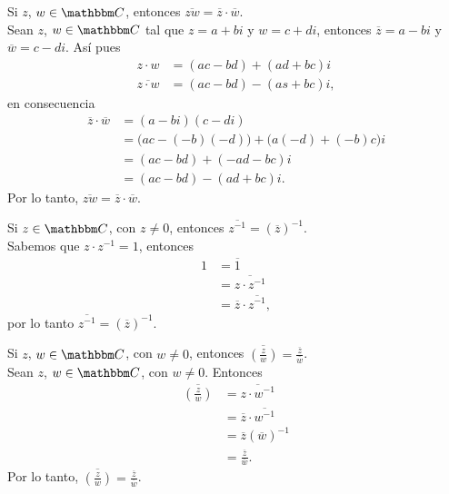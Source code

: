 \begin{proposition}
    Si $z$, $w \in \CC$, entonces $\overline{zw}=\overline{z} \cdot \overline{w}$. \\
    \demostracion Sean $z$, $w \in \CC$ tal que $z=a+bi$ y $w=c+di$, entonces $\overline{z}=a-bi$ y $\overline{w}=c-di$. Así pues
    \begin{align*}
        z \cdot w &=(ac-bd)+(ad+bc)i \\
        \overline{z \cdot w} &=(ac-bd)-(as+bc)i,
    \end{align*}
    en consecuencia
    \begin{align*}
        \overline{z} \cdot \overline{w} &=(a-bi)(c-di) \\
        &=\big( ac-(-b)(-d) \big) +\big( a(-d)+(-b)c \big) i \\
        &=(ac-bd)+(-ad-bc)i \\
        &=(ac-bd)-(ad+bc)i.
    \end{align*}
    Por lo tanto, $\overline{zw}=\overline{z} \cdot \overline{w}$.
\end{proposition}

\begin{proposition}
    Si $z \in \CC$, con $z \neq 0$, entonces $\overline{z^{-1}}=\left( \overline{z} \right)^{-1}$. \\
    \demostracion Sabemos que $z \cdot z^{-1}=1$, entonces
    \begin{align*}
        1 &=\overline{1} \\
        & =\overline{z \cdot z^{-1}} \\
        & =\overline{z} \cdot \overline{z^{-1}},
    \end{align*}
    por lo tanto $\overline{z^{-1}}=\left( \overline{z} \right)^{-1}$.
\end{proposition}

\begin{proposition}
    Si $z$, $w \in \CC$, con $w \neq 0$, entonces $\displaystyle \overline{\left( \frac{z}{w} \right)}=\frac{\overline{z}}{\overline{w}}$. \\
    \demostracion Sean $z$, $w \in \CC$, con $w \neq 0$. Entonces
    \begin{align*}
        \overline{\left( \frac{z}{w} \right)} &= \overline{z \cdot w^{-1}} \\
        & =\overline{z} \cdot \overline{w^{-1}} \\
        & =\overline{z} (\overline{w})^{-1} \\
        & =\frac{\overline{z}}{\overline{w}}.
    \end{align*}
    Por lo tanto, $\displaystyle \overline{\left( \frac{z}{w} \right)}=\frac{\overline{z}}{\overline{w}}$.
\end{proposition}

